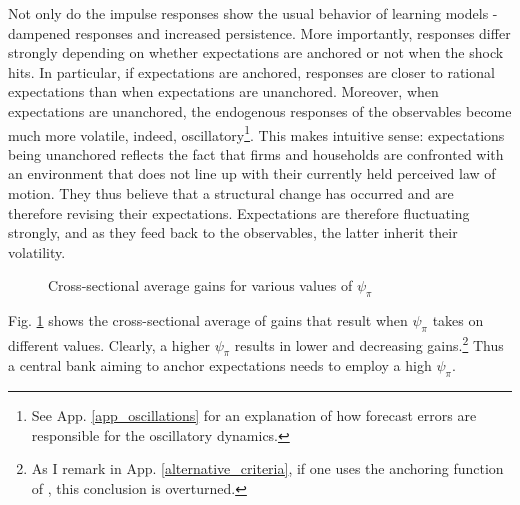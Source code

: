 \documentclass[11pt]{article}
\def \myFigPath {../../figures/}
\renewcommand{\[}{\begin{equation}}
\renewcommand{\]}{\end{equation}}
\def\fignameGainPsiSmall{command_IFS_anchoring_pretty_invgain_again_critCUSUM_constant_only_params_psi_pi_1_01_psi_x_0_gbar_0_145_thetbar_16_thettilde_2_5_kap_0_8_lamx_0_lami_0_2020_06_05}
\def\fignameGainPsiMedium{command_IFS_anchoring_pretty_invgain_again_critCUSUM_constant_only_params_psi_pi_1_5_psi_x_0_gbar_0_145_thetbar_16_thettilde_2_5_kap_0_8_lamx_0_lami_0_2020_06_05}
\def\fignameGainPsiBig{command_IFS_anchoring_pretty_invgain_again_critCUSUM_constant_only_params_psi_pi_2_psi_x_0_gbar_0_145_thetbar_16_thettilde_2_5_kap_0_8_lamx_0_lami_0_2020_06_05}
\begin{document}
Not only do the impulse responses show the usual behavior of learning models - dampened responses and increased persistence. More importantly, responses differ strongly depending on whether expectations are anchored or not when the shock hits. In particular, if expectations are anchored, responses are closer to rational expectations than when expectations are unanchored. Moreover, when expectations are unanchored, the endogenous responses of the observables become much more volatile, indeed, oscillatory\footnote{See App. \ref{app_oscillations} for an explanation of how forecast errors are responsible for the oscillatory dynamics.}. This makes intuitive sense: expectations being unanchored reflects the fact that firms and households are confronted with an environment that does not line up with their currently held perceived law of motion. They thus believe that a structural change has occurred and are therefore revising their expectations. Expectations are therefore fluctuating strongly, and as they feed back to the observables, the latter inherit their volatility. 

\begin{figure}[h!]
\caption{Cross-sectional average gains for various values of $\psi_{\pi}$}
\label{anchor_psi}
\end{figure}

Fig. \ref{anchor_psi} shows the cross-sectional average of gains that result when $\psi_{\pi}$ takes on different values. Clearly, a higher $\psi_{\pi}$ results in lower and decreasing gains.\footnote{As I remark in App. \ref{alternative_criteria}, if one uses the anchoring function of \cite{carvalho2019anchored}, this conclusion is overturned.} Thus a central bank aiming to anchor expectations needs to employ a high $\psi_{\pi}$. 
\end{document}

